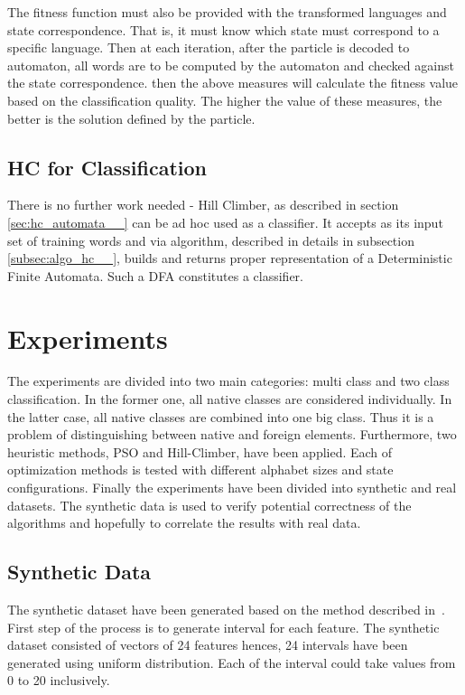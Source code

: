 \documentclass{mini}
\begin{document}
The fitness function must also be provided with the transformed languages and state correspondence. That is, it must know which state must correspond to a specific language. Then at each iteration, after the particle is decoded to automaton, all words are to be computed by the automaton and checked against the state correspondence. then the above measures will calculate the fitness value based on the classification quality. The higher the value of these measures, the better is the solution defined by the particle.

\section{HC for Classification}
There is no further work needed - Hill Climber, as described in section \ref{sec:hc_automata__} can be ad hoc used as a classifier. It accepts as its input set of training words and via algorithm, described in details in subsection \ref{subsec:algo_hc__}, builds and returns proper representation of a Deterministic Finite Automata. Such a DFA constitutes a classifier.

\chapter{Experiments}\label{chap:experiments}

The experiments are divided into two main categories: multi class and two class classification. In the former one, all native classes are considered individually. In the latter case, all native classes are combined into one big class. Thus it is a problem of distinguishing between native and foreign elements. Furthermore, two heuristic methods, PSO and Hill-Climber, have been applied. Each of optimization methods is tested with different alphabet sizes and state configurations. Finally the experiments have been divided into synthetic and real datasets. The synthetic data is used to verify potential correctness of the algorithms and hopefully to correlate the results with real data.

\section{Synthetic Data} \label{section:synthetic_data}

The synthetic dataset have been generated based on the method described in~\cite{rejector_geo}. First step of the process is to generate interval for each feature. The synthetic dataset consisted of vectors of 24 features hences, 24 intervals have been generated using uniform distribution. Each of the interval could take values from 0 to 20 inclusively. 
\end{document}
